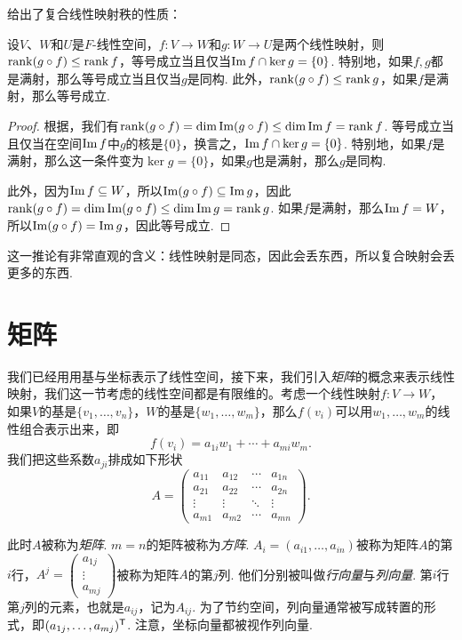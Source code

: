  给出了复合线性映射秩的性质：
\begin{corollary}\label{cor:rank-composition}
设$V$、$W$和$U$是$F$-线性空间，$f:V\to W$和$g:W\to U$是两个线性映射，则$\operatorname*{rank} (g\circ f)\leq \operatorname*{rank} f$，等号成立当且仅当$\operatorname*{Im} f\cap \ker g=\{0\}$. 特别地，如果$f,g$都是满射，那么等号成立当且仅当$g$是同构. 此外，$\operatorname*{rank} (g\circ f)\leq \operatorname*{rank} g$，如果$f$是满射，那么等号成立. 
\end{corollary}
\begin{proof}
    根据，我们有$\operatorname*{rank} (g\circ f)=\dim\operatorname*{Im} (g\circ f)\leq \dim \operatorname*{Im} f=\operatorname*{rank} f$. 等号成立当且仅当在空间$\operatorname*{Im} f$中$g$的核是$\{0\}$，换言之，$\operatorname*{Im} f\cap \ker g=\{0\}$. 特别地，如果$f$是满射，那么这一条件变为$\ker g=\{0\}$，如果$g$也是满射，那么$g$是同构. 
    
    此外，因为$\operatorname*{Im} f\subseteq W$，所以$\operatorname*{Im} (g\circ f)\subseteq \operatorname*{Im} g$，因此$\operatorname*{rank} (g\circ f)=\dim\operatorname*{Im} (g\circ f)\leq \dim \operatorname*{Im} g=\operatorname*{rank} g$. 如果$f$是满射，那么$\operatorname*{Im} f=W$，所以$\operatorname*{Im} (g\circ f)=\operatorname*{Im} g$，因此等号成立. 
\end{proof}

这一推论有非常直观的含义：线性映射是同态，因此会丢东西，所以复合映射会丢更多的东西. 

\section{矩阵}\label{sec:matrix}

我们已经用用基与坐标表示了线性空间，接下来，我们引入\emph{矩阵}的概念来表示线性映射，我们这一节考虑的线性空间都是有限维的。考虑一个线性映射$f:V\to W$，如果$V$的基是$\{v_1,\dots,v_n\}$，$W$的基是$\{w_1,\dots,w_m\}$，那么$f(v_i)$可以用$w_1,\dots,w_m$的线性组合表示出来，即
\[f(v_i)=a_{1i}w_1+\cdots+a_{mi}w_m.\]
我们把这些系数$a_{ji}$排成如下形状
\[A=\begin{pmatrix}
a_{11}&a_{12}&\cdots&a_{1n}\\
a_{21}&a_{22}&\cdots&a_{2n}\\
\vdots&\vdots&\ddots&\vdots\\
a_{m1}&a_{m2}&\cdots&a_{mn}
\end{pmatrix}.\]

此时$A$被称为\emph{矩阵}. $m=n$的矩阵被称为\emph{方阵}. $A_i=(a_{i1},\dots,a_{in})$被称为矩阵$A$的第$i$行，$A^j=\begin{pmatrix}a_{1j}\\\vdots\\a_{mj}\end{pmatrix}$被称为矩阵$A$的第$j$列. 他们分别被叫做\emph{行向量}与\emph{列向量}. 第$i$行第$j$列的元素，也就是$a_{ij}$，记为$A_{ij}$. 为了节约空间，列向量通常被写成转置的形式，即$(a_{1j},\dots,a_{mj})^{\mathsf{T}}$. 注意，坐标向量都被视作列向量. 

